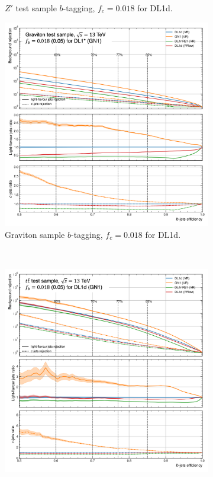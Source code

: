 \begin{figure}
\begin{subfigure}[t]{0.32\textwidth}
    \caption{$Z'$ test sample $b$-tagging, $f_c = 0.018$ for DL1d.}
    \label{fig:dl1dVRROCzp}
  \end{subfigure}
  \hfill
  \begin{subfigure}[t]{0.32\textwidth}
    \centering
    \includegraphics[width=\textwidth]{Images/FTAG/VRDL1d/ROC/grb.png}
    \caption{Graviton sample $b$-tagging, $f_c = 0.018$ for DL1d.}
    \label{fig:dl1dVRROCgr}
  \end{subfigure} \\
  \begin{subfigure}[t]{0.32\textwidth}
    \centering
    \includegraphics[width=\textwidth]{Images/FTAG/VRDL1d/ROC/ttbupf.png}

\end{subfigure}
\end{figure}
